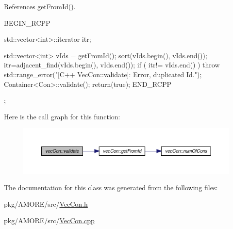 References getFromId().


\begin{DoxyCode}
                      {
        BEGIN_RCPP

        std::vector<int>::iterator itr;

        std::vector<int> vIds = getFromId();
        sort(vIds.begin(), vIds.end());
        itr=adjacent_find(vIds.begin(), vIds.end());
        if ( itr!= vIds.end() )  throw std::range_error("[C++ VecCon::validate]: 
      Error, duplicated Id.");
        Container<Con>::validate();
        return(true);
        END_RCPP

};
\end{DoxyCode}


Here is the call graph for this function:
\nopagebreak
\begin{figure}[H]
\begin{center}
\leavevmode
\includegraphics[width=400pt]{classvec_con_a7dc281e7258bf8be19a1591501c5434d_cgraph}
\end{center}
\end{figure}




The documentation for this class was generated from the following files:\begin{DoxyCompactItemize}
\item 
pkg/AMORE/src/\hyperlink{vec_con_8h}{VecCon.h}\item 
pkg/AMORE/src/\hyperlink{vec_con_8cpp}{VecCon.cpp}\end{DoxyCompactItemize}

